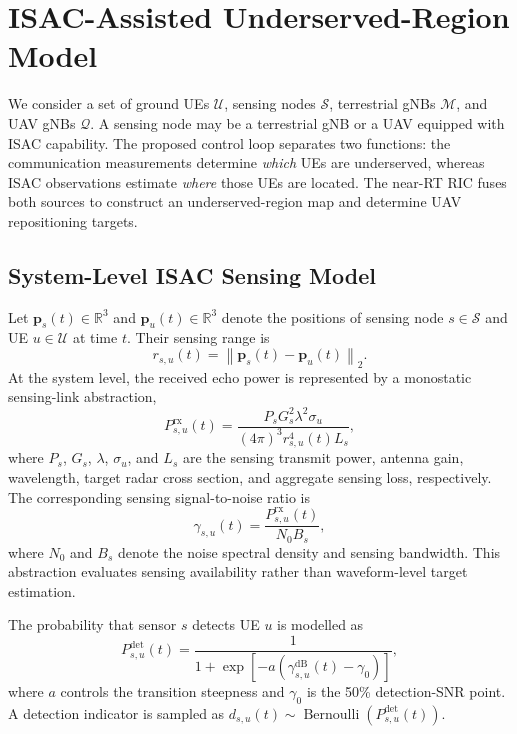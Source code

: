 \section{ISAC-Assisted Underserved-Region Model}
\label{sec:mathematical-model}

We consider a set of ground UEs $\mathcal{U}$, sensing nodes
$\mathcal{S}$, terrestrial gNBs $\mathcal{M}$, and UAV gNBs
$\mathcal{Q}$. A sensing node may be a terrestrial gNB or a UAV equipped
with ISAC capability. The proposed control loop separates two functions:
the communication measurements determine \emph{which} UEs are
underserved, whereas ISAC observations estimate \emph{where} those UEs
are located. The near-RT RIC fuses both sources to construct an
underserved-region map and determine UAV repositioning targets.

\subsection{System-Level ISAC Sensing Model}

Let $\mathbf{p}_s(t)\in\mathbb{R}^3$ and
$\mathbf{p}_u(t)\in\mathbb{R}^3$ denote the positions of sensing node
$s\in\mathcal{S}$ and UE $u\in\mathcal{U}$ at time $t$. Their sensing
range is
\begin{equation}
 r_{s,u}(t)=\left\|\mathbf{p}_s(t)-\mathbf{p}_u(t)\right\|_2.
 \label{eq:isac-range}
\end{equation}
At the system level, the received echo power is represented by a
monostatic sensing-link abstraction,
\begin{equation}
 P_{s,u}^{\mathrm{rx}}(t)=
 \frac{P_sG_s^2\lambda^2\sigma_u}
 {(4\pi)^3r_{s,u}^4(t)L_s},
 \label{eq:sensing-power}
\end{equation}
where $P_s$, $G_s$, $\lambda$, $\sigma_u$, and $L_s$ are the sensing
transmit power, antenna gain, wavelength, target radar cross section,
and aggregate sensing loss, respectively. The corresponding sensing
signal-to-noise ratio is
\begin{equation}
 \gamma_{s,u}(t)=
 \frac{P_{s,u}^{\mathrm{rx}}(t)}{N_0B_s},
 \label{eq:sensing-snr}
\end{equation}
where $N_0$ and $B_s$ denote the noise spectral density and sensing
bandwidth. This abstraction evaluates sensing availability rather than
waveform-level target estimation.

The probability that sensor $s$ detects UE $u$ is modelled as
\begin{equation}
 P_{s,u}^{\mathrm{det}}(t)=
 \frac{1}
 {1+\exp[-a(\gamma_{s,u}^{\mathrm{dB}}(t)-\gamma_0)]},
 \label{eq:detection-probability}
\end{equation}
where $a$ controls the transition steepness and $\gamma_0$ is the
50\% detection-SNR point. A detection indicator is sampled as
$d_{s,u}(t)\sim\operatorname{Bernoulli}
(P_{s,u}^{\mathrm{det}}(t))$.

